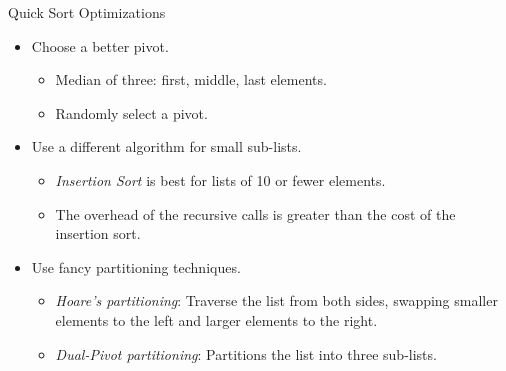 \documentclass[14pt,aspectratio=1610]{beamer}
\begin{document}
\begin{frame}{Quick Sort Optimizations}
\begin{itemize}\setlength\itemsep{0.5em}
  \item<+-> Choose a better pivot.
  \begin{itemize}
    \item Median of three: first, middle, last elements.
    \item Randomly select a pivot.
  \end{itemize}
  \item<+-> Use a different algorithm for small sub-lists.
  \begin{itemize}
    \item
      \textit{Insertion Sort} is best for lists of 10 or fewer elements.
    \item
      The overhead of the recursive calls is greater than the cost of the insertion sort.
  \end{itemize}
  \item<+-> Use fancy partitioning techniques.
  \begin{itemize}
    \item
      \textit{Hoare's partitioning}: Traverse the list from both sides, swapping smaller elements to the left and larger elements to the right.
    \item
      \textit{Dual-Pivot partitioning}: Partitions the list into three sub-lists.
  \end{itemize}
\end{itemize}
\end{frame}
\end{document}
